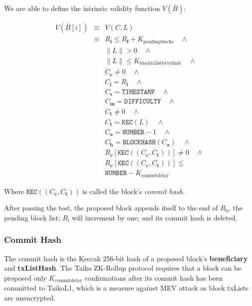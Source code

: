 \documentclass[9pt,oneside]{amsart}
\begin{document}
\begin{multicols}{2}
We are able to define the intrinsic validity function $V(\bar{B})$:

\begin{eqnarray}
V(\bar{B}[i]) & \equiv &   V(C,L)  \\
\nonumber & \equiv &   R_\mathbf{i} \le R_\mathbf{f} + K_\mathrm{pendingblocks}   \quad \wedge \\
\nonumber& & \lVert L \rVert > 0 \quad \wedge \\
\nonumber & & \lVert L \rVert \le K_{\mathrm{blocktxlistbytelimit}} \quad \wedge \\
\nonumber& & C_{\mathbf{c}} \ne 0   \quad \wedge \\
\nonumber& & C_{\mathbf{i}} = R_\mathbf{i}   \quad \wedge \\
\nonumber& & C_{\mathbf{s}} = \texttt{TIMESTAMP}   \quad \wedge \\
\nonumber& & C_{\mathbf{m}} = \texttt{DIFFICULTY}   \quad \wedge \\
\nonumber& & C_{\mathbf{t}} \ne 0   \quad \wedge \\
\nonumber& & C_{\mathbf{t}} = \texttt{KEC}(L)   \quad \wedge \\
\nonumber& & C_{\mathbf{a}} = \texttt{NUMBER} - 1   \quad \wedge \\
\nonumber& & C_{\mathbf{h}} = \texttt{BLOCKHASH}(C_{\mathbf{a}})   \quad \wedge \\
\nonumber& & R_{\mathbf{c}}[\texttt{KEC}((C_{\mathbf{c}}, C_{\mathbf{t}}))] \ne 0  \quad \wedge \\
\nonumber& & R_{\mathbf{c}}[\texttt{KEC}((C_{\mathbf{c}}, C_{\mathbf{t}}))] \le  \\
\nonumber& &  \texttt{NUMBER}   -  K_{\mathrm{commitdelay}}
\end{eqnarray}

Where $\texttt{KEC}((C_{\mathbf{c}}, C_{\mathbf{t}}))$ is called the block's \textit{commit hash}.

After passing the test, the proposed block appends itself to the end of $R_\mathrm{b}$, the pending block list; $R_\mathrm{i}$ will increment by one; and its commit hash is deleted.


\subsubsection{Commit Hash} The commit hash is the Keccak 256-bit hash of a proposed block's \textbf{beneficiary} and \textbf{txListHash}. The Taiko ZK-Rollup protocol requires that a block can be proposed only $K_{\mathrm{commitdelay}}$ confirmations after its commit hash has been committed to  {TaikoL1}, which is a measure against MEV attack \cite{mevethfoundation} as block txLists are unencrypted.


\end{multicols}
\end{document}
